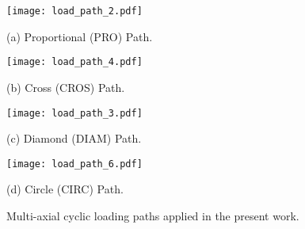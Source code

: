 \documentclass[preprint,5p,twocolumn,11pt,sort&compress]{elsarticle}
\begin{document}

\begin{figure}
  \begin{minipage}[t]{0.5\linewidth}
  \nonumber
    \centering
    \texttt{[image: load\_path\_2.pdf]}
    \centerline{\small (a) Proportional (PRO) Path.}
  \end{minipage}%
  \begin{minipage}[t]{0.5\linewidth}
    \centering
    \texttt{[image: load\_path\_4.pdf]}
    \centerline{\small (b) Cross (CROS) Path.}
  \end{minipage}
  \begin{minipage}[t]{0.5\linewidth}
  \nonumber
    \centering
    \texttt{[image: load\_path\_3.pdf]}
    \centerline{\small (c) Diamond (DIAM) Path.}
  \end{minipage}%
  \begin{minipage}[t]{0.5\linewidth}
    \centering
    \texttt{[image: load\_path\_6.pdf]}
    \centerline{\small (d) Circle (CIRC) Path.}
  \end{minipage}
  \caption{Multi-axial cyclic loading paths applied in the present work.}
  \label{Fig:LoadPath}
\end{figure}
\end{document}
